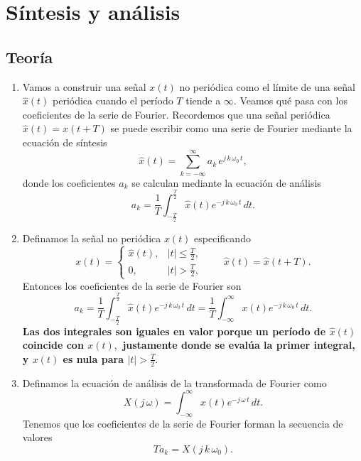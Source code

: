 \section{Síntesis y análisis}

\subsection{Teoría}

\begin{enumerate}
	
	\item Vamos a construir una señal $x(t)$ no periódica como el límite de una señal $\hat{x}(t)$ periódica cuando el período $T$ tiende a $\infty$. Veamos qué pasa con los coeficientes de la serie de Fourier. Recordemos que una señal periódica $\hat{x}(t) = \hat{x}(t+T)$ se puede escribir como una serie de Fourier mediante la ecuación de síntesis 
	\begin{equation}
		\hat{x}(t) = \sum_{k=-\infty}^{\infty} a_{k} \, e^{j \, k \, \omega_{0} \, t},
	\end{equation}
	donde los coeficientes $a_{k}$ se calculan mediante la ecuación de análisis 
	\begin{equation}
		a_{k} = \frac{1}{T} \int_{-\frac{T}{2}}^{\frac{T}{2}} \hat{x}(t) e^{-j \, k \, \omega_{0} \, t} \, dt.
	\end{equation}
	
	\item Definamos la señal no periódica $x(t)$ especificando 
	\begin{equation}
		x(t) = \begin{cases}
			\hat{x}(t), & |t| \leq \frac{T}{2}, \\
			0, & |t| > \frac{T}{2},
		\end{cases}
		\qquad
		\hat{x}(t) = \hat{x}(t+T) .
	\end{equation}
	Entonces los coeficientes de la serie de Fourier son 
	\begin{equation}
		a_{k} = \frac{1}{T} \int_{-\frac{T}{2}}^{\frac{T}{2}} \hat{x}(t) e^{-j \, k \, \omega_{0} \, t} \, dt = \frac{1}{T} \int_{-\infty}^{\infty} x(t) e^{-j \, k \, \omega_{0} \, t} \, dt.
	\end{equation}
	\textbf{Las dos integrales son iguales en valor porque un período de $\hat{x}(t)$ coincide con $x(t),$ justamente donde se evalúa la primer integral, y $x(t)$ es nula para $|t| > \frac{T}{2}.$}
	
	\item Definamos la ecuación de análisis de la transformada de Fourier como 
	\begin{equation}
		X(j \, \omega) = \int_{-\infty}^{\infty} x(t) e^{-j \, \omega \, t} \, dt.
	\end{equation}
	Tenemos que los coeficientes de la serie de Fourier forman la secuencia de valores 
	\begin{equation}
		T a_{k} = X(j \, k \, \omega_{0}) .
	\end{equation}
	

\end{enumerate}
